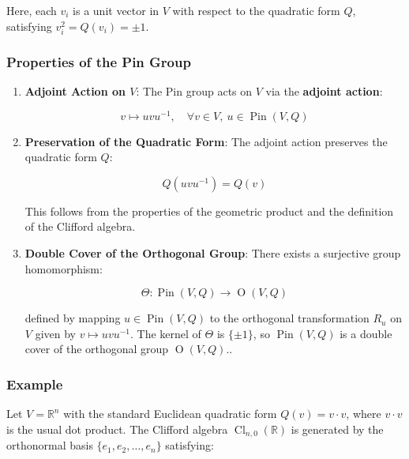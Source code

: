 \documentclass[a4paper,14pt]{article}
\theoremstyle{plain} %
\theoremstyle{definition} %
\theoremstyle{remark} %
\theoremstyle{definition}
\theoremstyle{remark}
\theoremstyle{remark}
\begin{document}
	Here, each \( v_i \) is a unit vector in \( V \) with respect to the quadratic form \( Q \), satisfying \( v_i^2 = Q(v_i) = \pm 1 \).
	
	\subsubsection{Properties of the Pin Group}
	
	\begin{enumerate}
		\item \textbf{Adjoint Action on \( V \)}: The Pin group acts on \( V \) via the \textbf{adjoint action}:
		
		\begin{equation}
			\label{adjoint_action}
			v \mapsto u v u^{-1}, \quad \forall v \in V, \ u \in \operatorname{Pin}(V, Q)
		\end{equation}
		
		\item \textbf{Preservation of the Quadratic Form}: The adjoint action preserves the quadratic form \( Q \):
		
		\begin{equation}
			Q(u v u^{-1}) = Q(v)
		\end{equation}
		
		This follows from the properties of the geometric product and the definition of the Clifford algebra.
		
		\item \textbf{Double Cover of the Orthogonal Group}: There exists a surjective group homomorphism:
		
		\[
		\Theta: \operatorname{Pin}(V, Q) \rightarrow \operatorname{O}(V, Q)
		\]
		
		defined by mapping \( u \in \operatorname{Pin}(V, Q) \) to the orthogonal transformation \( R_u \) on \( V \) given by \( v \mapsto u v u^{-1} \). The kernel of \( \Theta \) is \( \{ \pm 1 \} \), so \( \operatorname{Pin}(V, Q) \) is a double cover of the orthogonal group \( \operatorname{O}(V, Q) \)..
		
	\end{enumerate}
	
	\subsubsection{Example}
	
	Let \( V = \mathbb{R}^n \) with the standard Euclidean quadratic form \( Q(v) = v \cdot v \), where \( v \cdot v \) is the usual dot product. The Clifford algebra \( \operatorname{Cl}_{n,0}(\mathbb{R}) \) is generated by the orthonormal basis \( \{ e_1, e_2, \dots, e_n \} \) satisfying:
	
\end{document}
